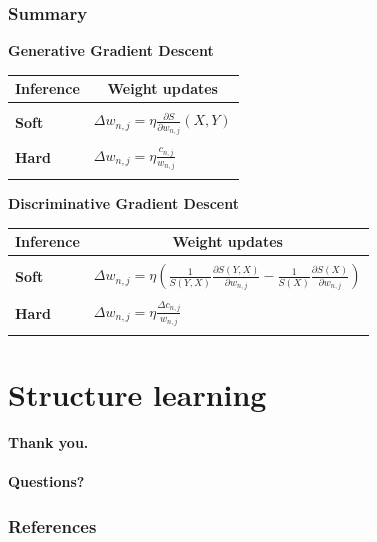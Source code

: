 \documentclass{beamer}
\newcommand{\ddspn}[2]{\frac{\partial#1}{\partial#2}}
\begin{document}
\begin{frame}
  \frametitle{Summary}

  \scriptsize
  \begin{center}\footnotesize\textbf{Generative Gradient Descent}\end{center}\vspace{-0.25cm}
  \begin{table}[h]
    \centering
    \begin{tabular}{l|l}
      \hline
      \multicolumn{1}{c}{\bfseries Inference} & \multicolumn{1}{c}{\bfseries Weight updates}\\
      \hline & \\
      \textbf{Soft} & \(\displaystyle \Delta w_{n,j}=\eta\ddspn{S}{w_{n,j}}(X, Y)\) \\
      & \\
      \textbf{Hard} & \(\displaystyle \Delta w_{n,j}=\eta\frac{c_{n,j}}{w_{n,j}}\) \\
      & \\
      \hline
    \end{tabular}
  \end{table}

  \begin{center}\footnotesize\textbf{Discriminative Gradient Descent}\end{center}\vspace{-0.25cm}
  \begin{table}[h]
    \centering
    \begin{tabular}{l|l}
      \hline
      \multicolumn{1}{c}{\bfseries Inference} & \multicolumn{1}{c}{\bfseries Weight updates}\\
      \hline & \\
      \textbf{Soft} & \(\displaystyle \Delta
        w_{n,j}=\eta\left(\frac{1}{S(Y,X)}\ddspn{S(Y,X)}{w_{n,j}}-\frac{1}{S(X)}
          \ddspn{S(X)}{w_{n,j}}\right)\) \\
      & \\
      \textbf{Hard} & \(\displaystyle \Delta w_{n,j}=\eta\frac{\Delta c_{n,j}}{w_{n,j}}\) \\
      & \\
      \hline
    \end{tabular}
  \end{table}

\end{frame}

\section{Structure learning}

\begin{frame}
\end{frame}


\begin{frame}[standout]
  \textbf{Thank you.\\~\\Questions?}
\end{frame}

\begin{frame}[t,allowframebreaks]
  \frametitle{References}
  \printbibliography[heading=none]
\end{frame}
\end{document}
